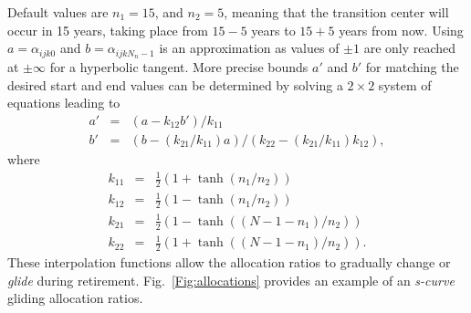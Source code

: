 \documentclass{report}[fleqn,12pt]
\begin{document}
\begin{description}[leftmargin=4em,style=multiline]
	Default values are $n_1 = 15$, and $n_2 = 5$, meaning that the transition center will occur
	in 15 years, taking place from $15-5$ years to $15+5$ years from now.
	Using $a = \alpha_{ijk0}$ and $b = \alpha_{ijkN_n-1}$ is an approximation as values of $\pm 1$
	are only reached at $\pm \infty$ for a hyperbolic tangent.
	More precise bounds $a'$ and $b'$ for matching the desired start and end values
	can be determined by solving a $2\times 2$ system of equations leading to
	\begin{eqnarray}
		a' &=& (a - k_{12}b')/k_{11} \nonumber \\
		b' &=& (b - (k_{21}/k_{11})a)/(k_{22} - (k_{21}/k_{11})k_{12}),
	\end{eqnarray}
	where
	\begin{eqnarray}
		k_{11} &=& \frac{1}{2}(1 + \tanh(n_1/n_2)) \nonumber \\
		k_{12} &=& \frac{1}{2}(1 - \tanh(n_1/n_2)) \nonumber \\
		k_{21} &=& \frac{1}{2}(1 - \tanh((N-1-n_1)/n_2)) \nonumber \\
		k_{22} &=& \frac{1}{2}(1 + \tanh((N-1-n_1)/n_2)).
	\end{eqnarray}
	These interpolation functions allow the allocation ratios to gradually change
	or {\em glide} during retirement. Fig.~\ref{Fig:allocations} provides an example
	of an {\em s-curve} gliding allocation ratios.


\end{description}
\end{document}
